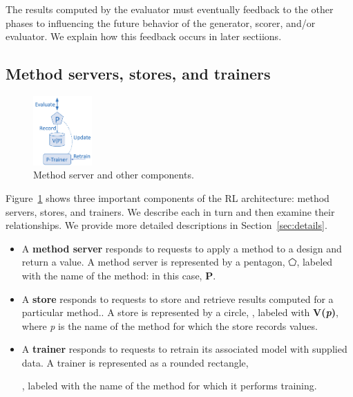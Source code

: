 \documentclass[10pt]{article}
\begin{document}
The results computed by the evaluator must eventually feedback to the other phases to influencing the future behavior of the generator, scorer, and/or evaluator. 
We explain how this feedback occurs in later sectiions.


\subsection{Method servers, stores, and trainers}


\begin{figure}
\vspace{-2ex}
  \centering
  \includegraphics[width=0.2\textwidth,trim=0in 0in 0in 0in,clip]{./Figs/servers.png}
  \vspace{-4ex}
  \caption{Method server and other components.
\label{fig:server}}
\end{figure}

Figure~\ref{fig:server} shows three important components of the RL architecture: method servers, stores, and trainers. We describe each in turn and then examine their relationships.
We provide more detailed descriptions in Section~\ref{sec:details}.
\begin{itemize}
\itemsep-0.3em 
\item
A \textbf{method server} responds to requests to apply a method to a design and return a value. 
A method server is represented by a pentagon, $\pentagon$, labeled with the name of the method: in this case, \textbf{P}. 
\item
A \textbf{store} responds to requests to store and retrieve results computed for a particular method..
A store is represented by a circle, \textbigcircle,
labeled with \textbf{V(\emph{p})}, where \emph{p} is the name of the method for which the store records values.
\item
A \textbf{trainer} responds to requests to retrain its associated model with supplied data.
A trainer is represented as a rounded rectangle, , labeled with the name of the method for which it performs training.
\end{itemize}
\end{document}
